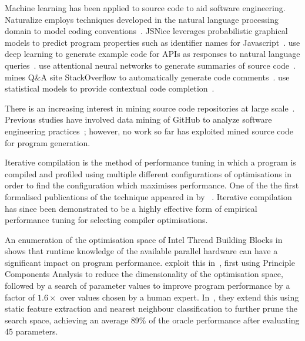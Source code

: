Machine learning has been applied to source code to aid software engineering.  Naturalize employs techniques developed in the natural language processing domain to model coding conventions~\cite{Allamanis2014a}. JSNice leverages probabilistic graphical models to predict program properties such as identifier names for Javascript~\cite{Raychev}. \citeauthor{Zhang2015a} use deep learning to generate example code for APIs as responses to natural language queries~\cite{Zhang2015a}. \citeauthor{Allamanis2016} use attentional neural networks to generate summaries of source code~\cite{Allamanis2016}. \citeauthor{Wong2013} mines Q\&A site StackOverflow to automatically generate code comments~\cite{Wong2013}. \citeauthor{Raychev2014} use statistical models to provide contextual code completion~\cite{Raychev2014}.

There is an increasing interest in mining source code repositories at large scale~\cite{Allamanis2013a,White2015a,Bird2009}. Previous studies have involved data mining of GitHub to analyze software engineering practices~\cite{Wu2014,Guzman2014,Baishakhi2014a,Vasilescu2015}; however, no work so far has exploited mined source code for program generation.



Iterative compilation is the method of performance tuning in which a program is compiled and profiled using multiple different configurations of optimisations in order to find the configuration which maximises performance. One of the the first formalised publications of the technique appeared in \citeyear{Bodin1998} by \citeauthor{Bodin1998}~\cite{Bodin1998}.  Iterative compilation has since been demonstrated to be a highly effective form of empirical performance tuning for selecting compiler optimisations.

An enumeration of the optimisation space of Intel Thread Building Blocks in~\cite{Contreras2008} shows that runtime knowledge of the available parallel hardware can have a significant impact on program performance. \citeauthor{Collins2012} exploit this in~\cite{Collins2012}, first using Principle Components Analysis to reduce the dimensionality of the optimisation space, followed by a search of parameter values to improve program performance by a factor of $1.6\times$ over values chosen by a human expert. In~\cite{Collins2013}, they extend this using static feature extraction and nearest neighbour classification to further prune the search space, achieving an average 89\% of the oracle performance after evaluating 45 parameters.

